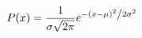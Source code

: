 \documentclass[11pt]{article}
\begin{document}

$$ P(x) = \frac{1}{{\sigma \sqrt {2\pi } }}e^{{{ - \left( {x - \mu } \right)^2 } \mathord{\left/ {\vphantom {{ - \left( {x - \mu } \right)^2 } {2\sigma ^2 }}} \right. \kern-\nulldelimiterspace} {2\sigma ^2 }}} $$


\clearpage

%


\end{document}
